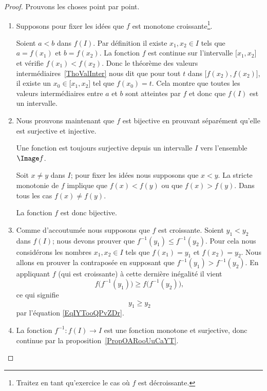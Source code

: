 \begin{proof}

	Prouvons les choses point par point.

	\begin{enumerate}
		\item
		      Supposons pour fixer les idées que \( f\) est monotone croissante\footnote{Traitez en tant qu'exercice le cas où \(  f\) est décroissante.}.

		      Soient \( a< b\) dans \( f(I)\). Par définition il existe \( x_1,x_2\in I\) tels que \( a=f(x_1)\) et \( b=f(x_2)\). La fonction \( f\) est continue sur l'intervalle \( \mathopen[ x_1 , x_2 \mathclose]\) et vérifie \( f(x_1)<f(x_2)\). Donc le théorème des valeurs intermédiaires~\ref{ThoValInter} nous dit que pour tout \( t\) dans \( \mathopen[ f(x_2) , f(x_2) \mathclose]\), il existe un \( x_0\in\mathopen[ x_1 , x_2 \mathclose]\) tel que \( f(x_0)=t\). Cela montre que toutes les valeurs intermédiaires entre \( a\) et \( b\) sont atteintes par \( f\) et donc que \( f(I)\) est un intervalle.

		\item
		      Nous prouvons maintenant que \( f\) est bijective en prouvant séparément qu'elle est surjective et injective.

		      \begin{subproof}
			      Une fonction est toujours surjective depuis un intervalle \( I\) vers l'ensemble \(\Image f \).

			      Soit \( x\neq y\) dans \( I\); pour fixer les idées nous supposons que \( x<y\). La stricte monotonie de \( f\) implique que \( f(x)<f(y)\) ou que \( f(x)>f(y)\). Dans tous les cas \( f(x)\neq f(y)\).

		      \end{subproof}
		      La fonction \( f\) est donc bijective.

		\item
		      Comme d'accoutumée nous supposons que \( f\) est croissante. Soient \( y_1<y_2\) dans \( f(I)\); nous devons prouver que \( f^{-1}(y_1)\leq f^{-1}(y_2)\). Pour cela nous considérons les nombres \( x_1,x_2\in I\) tels que \( f(x_1)=y_1\) et \( f(x_2)=y_2\). Nous allons en prouver la contraposée en supposant que \( f^{-1}(y_1)>f^{-1}(y_2)\). En appliquant \( f\) (qui est croissante) à cette dernière inégalité il vient
		      \begin{equation}
			      f\big( f^{-1}(y_1) \big)\geq f\big( f^{-1}(y_2) \big),
		      \end{equation}
		      ce qui signifie
		      \begin{equation}
			      y_1\geq y_2
		      \end{equation}
		      par l'équation \eqref{EqIYTooQPvZDr}.

		\item
		      La fonction \( f^{-1}\colon f(I)\to I\) est une fonction monotone et surjective, donc continue par la proposition~\ref{PropOARooUuCaYT}.

	\end{enumerate}
\end{proof}

